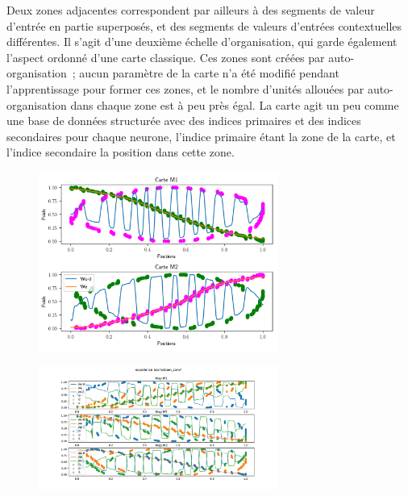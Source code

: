 \documentclass[../main]{subfiles}
\begin{document}
Deux zones adjacentes correspondent par ailleurs à des segments de valeur d'entrée en partie superposés, et des segments de valeurs d'entrées contextuelles différentes. Il s'agit d'une deuxième échelle d'organisation, qui garde également l'aspect ordonné d'une carte classique. Ces zones sont créées par auto-organisation~; aucun paramètre de la carte n'a été modifié pendant l'apprentissage pour former ces zones, et le nombre d'unités allouées par auto-organisation dans chaque zone est à peu près égal. La carte agit un peu comme une base de données structurée avec des indices primaires et des indices secondaires pour chaque neurone, l'indice primaire étant la zone de la carte, et l'indice secondaire la position dans cette zone.

\begin{figure}
	\includegraphics[width=0.7\textwidth]{2som_cercle_w.pdf}
\end{figure}

\begin{figure}
	\includegraphics[width=0.7\textwidth]{3som_cercle_w.pdf}
\end{figure}
\end{document}
